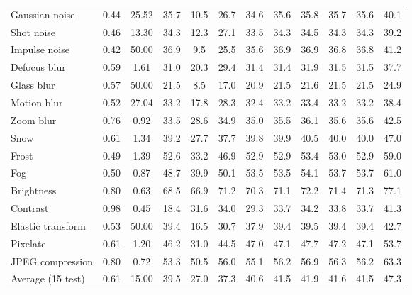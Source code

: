\begin{table}[t]
\begin{tabular}{l|cc|cc|cc|ccccc}
        Gaussian noise & 0.44 & 25.52 & 35.7 & 10.5 & 26.7 & 34.6 & 35.6 & 35.8 & 35.7 & 35.6 & 40.1 \\
        Shot noise & 0.46 & 13.30 & 34.3 & 12.3 & 27.1 & 33.5 & 34.3 & 34.5 & 34.3 & 34.3 & 39.2 \\
        Impulse noise & 0.42 & 50.00 & 36.9 & 9.5 & 25.5 & 35.6 & 36.9 & 36.9 & 36.8 & 36.8 & 41.2 \\
        Defocus blur & 0.59 & 1.61 & 31.0 & 20.3 & 29.4 & 31.4 & 31.4 & 31.9 & 31.5 & 31.5 & 37.7 \\
        Glass blur & 0.57 & 50.00 & 21.5 & 8.5 & 17.0 & 20.9 & 21.5 & 21.6 & 21.5 & 21.5 & 24.9 \\
        Motion blur & 0.52 & 27.04 & 33.2 & 17.8 & 28.3 & 32.4 & 33.2 & 33.4 & 33.2 & 33.2 & 38.4 \\
        Zoom blur & 0.76 & 0.92 & 33.5 & 28.6 & 34.9 & 35.0 & 35.5 & 36.1 & 35.6 & 35.6 & 42.5 \\
        Snow & 0.61 & 1.34 & 39.2 & 27.7 & 37.7 & 39.8 & 39.9 & 40.5 & 40.0 & 40.0 & 47.0 \\
        Frost & 0.49 & 1.39 & 52.6 & 33.2 & 46.9 & 52.9 & 52.9 & 53.4 & 53.0 & 52.9 & 59.0 \\
        Fog & 0.50 & 0.87 & 48.7 & 39.9 & 50.1 & 53.5 & 53.5 & 54.1 & 53.7 & 53.7 & 61.0 \\
        Brightness & 0.80 & 0.63 & 68.5 & 66.9 & 71.2 & 70.3 & 71.1 & 72.2 & 71.4 & 71.3 & 77.1 \\
        Contrast & 0.98 & 0.45 & 18.4 & 31.6 & 34.0 & 29.3 & 33.7 & 34.2 & 33.8 & 33.7 & 41.3 \\
        Elastic transform & 0.53 & 50.00 & 39.4 & 16.5 & 30.7 & 37.9 & 39.4 & 39.5 & 39.4 & 39.4 & 42.7 \\
        Pixelate & 0.61 & 1.20 & 46.2 & 31.0 & 44.5 & 47.0 & 47.1 & 47.7 & 47.2 & 47.1 & 53.7 \\
        JPEG compression & 0.80 & 0.72 & 53.3 & 50.5 & 56.0 & 55.1 & 56.2 & 56.9 & 56.3 & 56.2 & 63.3 \\
        \midrule
        Average (15 test) & 0.61 & 15.00 & 39.5 & 27.0 & 37.3 & 40.6 & 41.5 & 41.9 & 41.6 & 41.5 & 47.3 \\
        \bottomrule
    \end{tabular}
\end{table}
